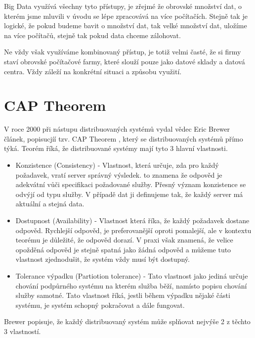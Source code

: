 Big Data využívá všechny tyto přístupy, je zřejmé že obrovské množství dat, o kterém jsme mluvili v úvodu se lépe zpracovává na více počítačích. Stejně tak je logické, že pokud budeme bavit o množství dat, tak velké množství dat, uložíme na více počítačů, stejně tak pokud data chceme zálohovat. 

Ne vždy však využíváme kombinovaný přístup, je totiž velmi časté, že si firmy staví obrovské počítačové farmy, které slouží pouze jako datové sklady a datová centra. Vždy záleží na konkrétní situaci a způsobu využití. 


\section{CAP Theorem}
V roce 2000 při nástupu distribuovaných systémů vydal vědec Eric Brewer článek, popisucjíí tzv. CAP Theorem \cite{cap}, který se distribuovaných systémů přímo týká. Teorém říká, že distribuované systémy mají tyto 3 hlavní vlastnosti. 

\begin{itemize}
\item Konzistence (Consistency) - Vlastnost, která určuje, zda pro každý požadavek, vratí server správný výsledek. to znamena že odpověd je adekvátní vůči specifikaci požadované služby. Přesný význam konzistence se odvýjí od typu služby. V případě dat ji definujeme tak, že každý server má aktuální a stejná data.

\item Dostupnost (Availability) - Vlastnost která říka, že každý požadavek dostane odpověd. Rychlejší odpověd, je preferovanější oproti pomalejší, ale v kontextu teorému je důležité, že odpověd dorazí. V praxi však znamená, že velice opožděná odpověd je stejně spatná jako žádná odpověd a můžeme tuto vlastnost zjednodušit, že systém vždy musí být dostupný.

\item Tolerance výpadku (Partiotion tolerance) - Tato vlastnost jako jediná určuje chování podpůrného systému na kterém služba běží, namísto popisu chování služby samotné. Tato vlastnost říká, jestli během výpadku nějaké části systému, je systém schopný pokračovat a dále fungovat.

\end{itemize}


Brewer popisuje, že každý distribuovaný systém může splňovat nejvýše 2 z těchto 3 vlastností.

